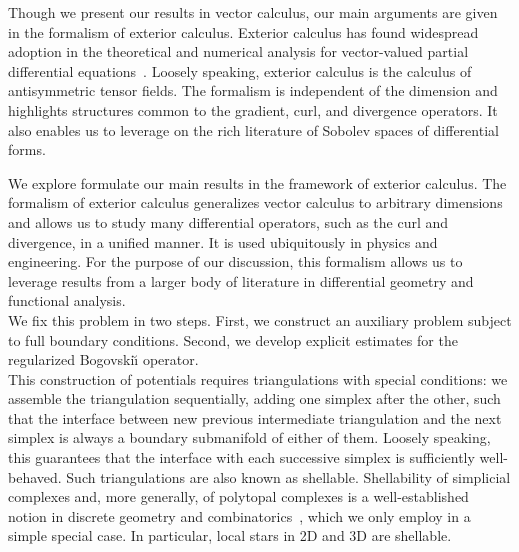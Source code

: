 \documentclass[a4paper]{article}
\begin{document}
Though we present our results in vector calculus, our main arguments are given in the formalism of exterior calculus. Exterior calculus has found widespread adoption in the theoretical and numerical analysis for vector-valued partial differential equations~\cite{hiptmair2002finite,arnold2006finite}. Loosely speaking, exterior calculus is the calculus of antisymmetric tensor fields. The formalism is independent of the dimension and highlights structures common to the gradient, curl, and divergence operators. It also enables us to leverage on the rich literature of Sobolev spaces of differential forms. 

We explore formulate our main results in the framework of exterior calculus.
The formalism of exterior calculus generalizes vector calculus to arbitrary dimensions and allows us to study many differential operators, such as the curl and divergence, in a unified manner. 
%
It is used ubiquitously in physics and engineering. 
%
For the purpose of our discussion, this formalism allows us to leverage results from a larger body of literature in differential geometry and functional analysis. 
\\


We fix this problem in two steps. First, we construct an auxiliary problem subject to full boundary conditions. Second, we develop explicit estimates for the regularized Bogovski\u{\i} operator. \nocite{gross2004electromagnetic,hiptmair2002finite}
\\



This construction of potentials requires triangulations with special conditions: 
we assemble the triangulation sequentially, adding one simplex after the other, such that the interface between new previous intermediate triangulation and the next simplex is always a boundary submanifold of either of them.  Loosely speaking, this guarantees that the interface with each successive simplex is sufficiently well-behaved. Such triangulations are also known as shellable. Shellability of simplicial complexes and, more generally, of polytopal complexes is a well-established notion in discrete geometry and combinatorics~\cite{ziegler2012lectures}, which we only employ in a simple special case. In particular, local stars in 2D and 3D are shellable. 
\end{document}
